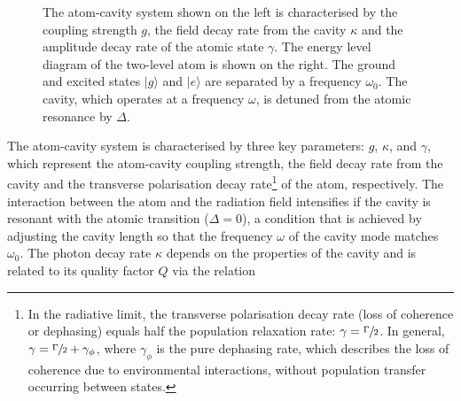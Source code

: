 \documentclass[../Thesis-IJspeert.tex]{subfiles}
\begin{document}
\begin{figure}[t]
	\caption[Coupling and decay channels in an atom-cavity system]{The atom-cavity system shown on the left is characterised by the coupling strength $g$, the field decay rate from the cavity $\kappa$ and the amplitude decay rate of the atomic state $\gamma$. The energy level diagram of the two-level atom is shown on the right. The ground and excited states $\vert{g}\rangle$ and $\vert{e}\rangle$ are separated by a frequency $\omega_{0}$. The cavity, which operates at a frequency $\omega$, is detuned from the atomic resonance by $\Delta$.}
	\label{fig:JCFPcavity}
\end{figure}
The atom-cavity system is characterised by three key parameters: $g$, $\kappa$, and $\gamma$, which represent the atom-cavity coupling strength, the field decay rate from the cavity and the transverse polarisation decay rate\footnote{In the radiative limit, the transverse polarisation decay rate (loss of coherence or dephasing) equals half the population relaxation rate: $\gamma=\sfrac{\Gamma}{2}$. In general, $\gamma=\sfrac{\Gamma}{2}+\gamma_\phi$, where $\gamma_\phi$ is the pure dephasing rate, which describes the loss of coherence due to environmental interactions, without population transfer occurring between states.} of the atom, respectively. The interaction between the atom and the radiation field intensifies if the cavity is resonant with the atomic transition ($\Delta=0$), a condition that is achieved by adjusting the cavity length so that the frequency $\omega$ of the cavity mode matches $\omega_0$. The photon decay rate $\kappa$ depends on the properties of the cavity and is related to its quality factor $Q$ via the relation
\end{document}

